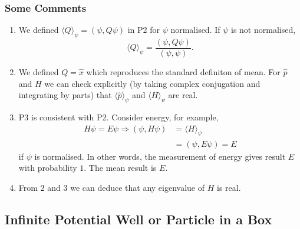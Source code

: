 \documentclass[a4paper]{article}
\begin{document}
\subsubsection{Some Comments}

\begin{enumerate}
\item We defined \(\langle Q\rangle_\psi = (\psi, Q\psi)\) in P2 for \(\psi\) normalised. If \(\psi\) is not normalised,
  \[
    \langle Q\rangle_\psi =  \frac{(\psi, Q\psi)}{(\psi, \psi)}.
    \]
  \item We defined \(Q=\hat x\) which reproduces the standard definiton of mean. For \(\hat p\) and \(H\) we can check explicitly (by taking complex conjugation and integrating by parts) that \(\langle \hat p \rangle_\psi\) and \(\langle H\rangle_\psi\) are real.
\item P3 is consistent with P2. Consider energy, for example,
  \begin{align*}
    H\psi = E\psi \Rightarrow (\psi, H\psi) &= \langle H\rangle_\psi\\
    &= (\psi, E\psi) = E
  \end{align*}
  if \(\psi\) is normalised. In other words, the measurement of energy gives result \(E\) with probability \(1\). The mean result is \(E\).
\item From $2$ and $3$ we can deduce that any eigenvalue of \(H\) is real.
\end{enumerate}

\subsection{Infinite Potential Well or Particle in a Box}
\end{document}
